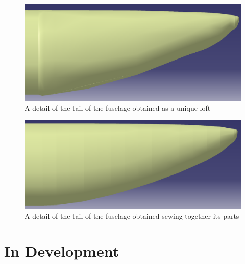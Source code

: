 \begin{figure}[H]
	\centering
		\includegraphics[width=6 cm]{Immagini/gui/CADfuselageTailBAD2.png}
		\caption{A detail of the tail of the fuselage obtained as a unique loft}
		\label{fig:badTail}
	\end{figure}
	
	\begin{figure}[H]
	\centering
		\includegraphics[width=6 cm]{Immagini/gui/CADfuselageTailOK.png}
		\caption{A detail of the tail of the fuselage obtained sewing together its parts}
		\label{fig:goodTail}
\end{figure}


\section{In Development}